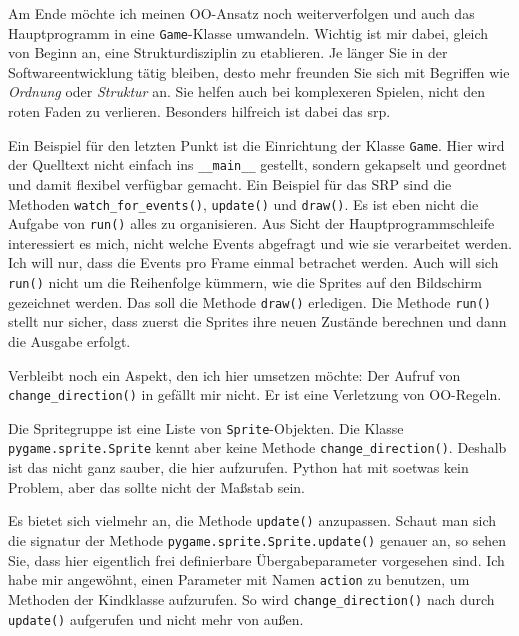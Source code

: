 Am Ende möchte ich meinen OO-Ansatz noch weiterverfolgen und auch das Hauptprogramm in eine \texttt{Game}-Klasse umwandeln. Wichtig ist mir dabei, gleich von Beginn an, eine Strukturdisziplin zu etablieren. Je länger Sie in der Softwareentwicklung tätig bleiben, desto mehr freunden Sie sich mit Begriffen wie \emph{Ordnung} oder \emph{Struktur} an. Sie helfen auch bei komplexeren Spielen, nicht den roten Faden zu verlieren. Besonders hilfreich ist dabei das \Gls{srp}.

\newpage
{}

Ein Beispiel für den letzten Punkt ist die Einrichtung der Klasse \texttt{Game}. Hier wird der Quelltext nicht einfach ins \texttt{\_\_main\_\_} gestellt, sondern gekapselt und geordnet und damit flexibel verfügbar gemacht. Ein Beispiel für das SRP sind die Methoden \texttt{watch\_for\_e\-vents()}, \texttt{update()} und \texttt{draw()}. Es ist eben nicht die Aufgabe von \texttt{run()} alles zu organisieren. Aus Sicht der Hauptprogrammschleife interessiert es mich, nicht welche Events abgefragt und wie sie verarbeitet werden. Ich will nur, dass die Events pro Frame einmal betrachet werden. Auch will sich \texttt{run()} nicht um die Reihenfolge kümmern, wie die Sprites auf den Bildschirm gezeichnet werden. Das soll die Methode \texttt{draw()} erledigen. Die Methode \texttt{run()} stellt nur sicher, dass zuerst die Sprites ihre neuen Zustände berechnen und dann die Ausgabe erfolgt.


Verbleibt noch ein Aspekt, den ich hier umsetzen möchte: Der Aufruf von \texttt{change\_di\-rec\-tion()} in  gefällt mir nicht. Er ist eine Verletzung von OO-Regeln. 

Die Spritegruppe ist eine Liste von \texttt{Sprite}-Objekten. Die Klasse \texttt{pygame.sprite.Sprite} kennt aber keine Methode \texttt{change\_direction()}. Deshalb ist das nicht ganz sauber, die hier aufzurufen. Python hat mit soetwas kein Problem, aber das sollte nicht der Maßstab sein. 

Es bietet sich vielmehr an, die Methode \texttt{update()} anzupassen. Schaut man sich die \gls{signatur} der Methode \texttt{pygame.sprite.Sprite.update()} genauer an, so sehen Sie, dass hier eigentlich frei definierbare Übergabeparameter vorgesehen sind.  Ich habe mir angewöhnt, einen Parameter mit Namen \texttt{action} zu benutzen, um Methoden der Kindklasse aufzurufen. So wird \texttt{change\_direction()} nach  durch \texttt{update()} aufgerufen und nicht mehr von außen.


